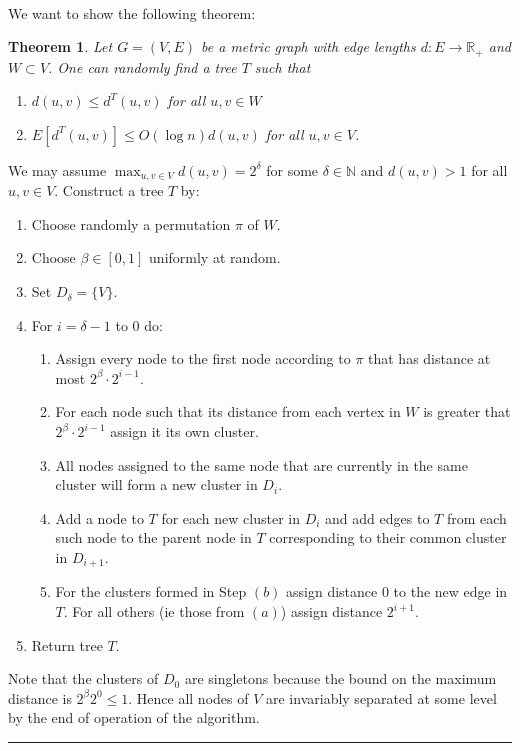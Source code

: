 \documentclass[letterpaper,12pt,oneside,onecolumn]{article}
\newcommand{\N}{\mathbb{N}} \newcommand{\R}{\mathbb{R}}
\newenvironment{proof}{{\bf Proof:  }}{\hfill\rule{2mm}{2mm}}
\newtheorem{theorem}[fact]{Theorem}
\begin{document}
\paragraph{}
We want to show the following theorem:
\begin{theorem}\label{th:tree-metric}
Let $G = (V,E)$ be a metric graph with edge lengths $d:E\rightarrow \R_+$ and $W \subset V$. One can randomly find a tree $T$ such that
\begin{enumerate}
\item $d(u,v) \leq d^T(u,v)$ for all $u,v\in W$
\item $E[d^T(u,v)] \leq O(\log n) d(u,v)$ for all $u,v\in V$.
\end{enumerate}
\end{theorem}
\begin{proof}
We may assume $\max_{u,v \in V} d(u,v) = 2^\delta$ for some $\delta \in \N$ and $d(u,v) > 1$ for all $u,v\in V$. Construct a tree $T$ by:
\begin{enumerate}
\item Choose randomly a permutation $\pi$ of $W$.
\item Choose $\beta \in [0,1]$ uniformly at random.
\item Set $D_\delta = \{V\}$.
\item For $i = \delta -1$ to $0$ do:
\begin{enumerate}
\item Assign every node to the first node according to $\pi$ that has distance at most $2^\beta \cdot 2^{i-1}$.
\item For each node such that its distance from each vertex in $W$ is greater that $2^\beta \cdot 2^{i-1}$ assign it its own cluster.
\item All nodes assigned to the same node that are currently in the same cluster will form a new cluster in $D_i$.
\item Add a node to $T$ for each new cluster in $D_i$ and add edges to $T$ from each such node to the parent node in $T$ corresponding to their common cluster in $D_{i+1}$.
\item For the clusters formed in Step $(b)$ assign distance $0$ to the new edge in $T$. For all others (ie those from $(a)$) assign distance $2^{i+1}$.
\end{enumerate}
\item Return tree $T$.
\end{enumerate}
Note that the clusters of $D_0$ are singletons because the bound on the maximum distance is $2^\beta 2^0 \leq 1$. Hence all nodes of $V$ are invariably separated at some level by the end of operation of the algorithm.

\end{proof}
\end{document}
